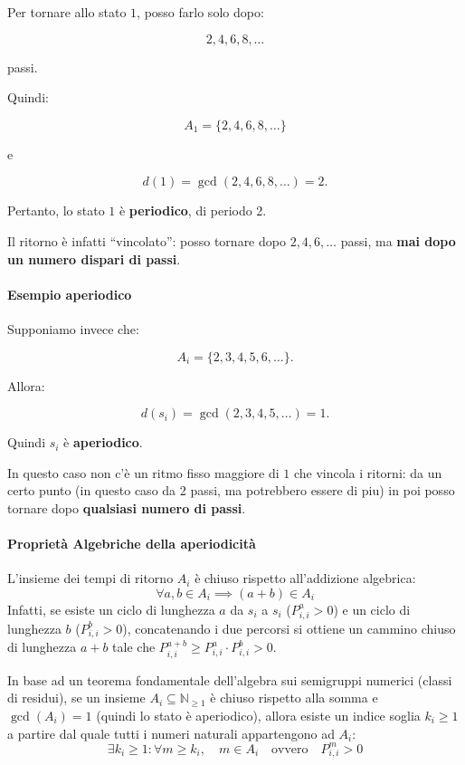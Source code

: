 Per tornare allo stato $1$, posso farlo solo dopo:

$$
2,4,6,8,\ldots
$$

passi.

Quindi:

$$
A_1=\{2,4,6,8,\ldots\}
$$

e

$$
d(1)=\gcd(2,4,6,8,\ldots)=2.
$$

Pertanto, lo stato $1$ è \textbf{periodico}, di periodo 2.

Il ritorno è infatti ``vincolato'': posso tornare dopo $2,4,6,\ldots$ passi, ma \textbf{mai dopo un numero dispari di passi}.

\paragraph{Esempio aperiodico}

Supponiamo invece che:

$$
A_i=\{2,3,4,5,6,\ldots\}.
$$

Allora:

$$
d(s_i)=\gcd(2,3,4,5,\ldots)=1.
$$

Quindi $s_i$ è \textbf{aperiodico}.

In questo caso non c'è un ritmo fisso maggiore di $1$ che vincola i ritorni: da un certo punto (in questo caso da 2 passi, ma potrebbero essere di piu) in poi posso tornare dopo \textbf{qualsiasi numero di passi}.


\paragraph{Proprietà Algebriche della aperiodicità}
L'insieme dei tempi di ritorno $A_i$ è chiuso rispetto all'addizione algebrica:
\begin{equation*}
\forall a, b \in A_i \implies (a + b) \in A_i
\end{equation*}
Infatti, se esiste un ciclo di lunghezza $a$ da $s_i$ a $s_i$ ($P_{i,i}^a > 0$) e un ciclo di lunghezza $b$ ($P_{i,i}^b > 0$), concatenando i due percorsi si ottiene un cammino chiuso di lunghezza $a+b$ tale che $P_{i,i}^{a+b} \ge P_{i,i}^a \cdot P_{i,i}^b > 0$.

In base ad un teorema fondamentale dell'algebra sui semigruppi numerici (classi di residui), se un insieme $A_i \subseteq \mathbb{N}_{\ge 1}$ è chiuso rispetto alla somma e $\gcd(A_i) = 1$ (quindi lo stato è aperiodico), allora esiste un indice soglia $k_i \ge 1$ a partire dal quale tutti i numeri naturali appartengono ad $A_i$:
\begin{equation*}
\exists k_i \ge 1 : \forall m \ge k_i, \quad m \in A_i \quad \text{ovvero} \quad P_{i,i}^m > 0
\end{equation*}

